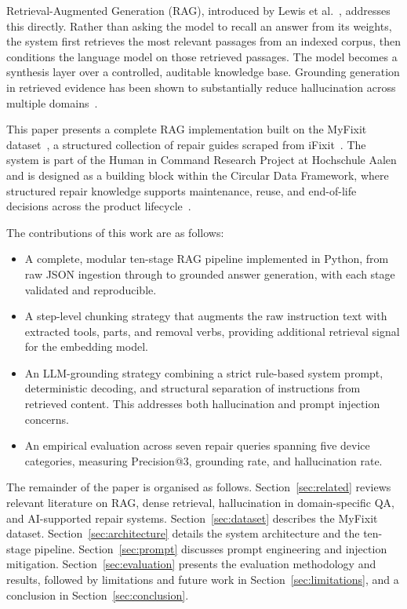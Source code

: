\documentclass[journal,onecolumn]{IEEEtran}
\begin{document}
Retrieval-Augmented Generation (RAG), introduced by Lewis et
al.~\cite{lewis2020rag}, addresses this directly. Rather than asking the model
to recall an answer from its weights, the system first retrieves the most
relevant passages from an indexed corpus, then conditions the language model
on those retrieved passages. The model becomes a synthesis layer over a
controlled, auditable knowledge base. Grounding generation in retrieved
evidence has been shown to substantially reduce hallucination across multiple
domains~\cite{gao2024ragsurvey, domaingroundedretrieval2026}.

This paper presents a complete RAG implementation built on the MyFixit
dataset~\cite{myfixit2021}, a structured collection of repair guides scraped
from iFixit~\cite{ifixit}. The system is part of the Human in Command Research
Project at Hochschule Aalen and is designed as a building block within the
Circular Data Framework, where structured repair knowledge supports
maintenance, reuse, and end-of-life decisions across the product
lifecycle~\cite{aiCircular2022, remanufacturing2025}.

The contributions of this work are as follows:

\begin{itemize}
    \item A complete, modular ten-stage RAG pipeline implemented in Python,
          from raw JSON ingestion through to grounded answer generation, with
          each stage validated and reproducible.
    \item A step-level chunking strategy that augments the raw instruction
          text with extracted tools, parts, and removal verbs, providing
          additional retrieval signal for the embedding model.
    \item An LLM-grounding strategy combining a strict rule-based system
          prompt, deterministic decoding, and structural separation of
          instructions from retrieved content. This addresses both
          hallucination and prompt injection concerns.
    \item An empirical evaluation across seven repair queries spanning five
          device categories, measuring Precision@3, grounding rate, and
          hallucination rate.
\end{itemize}

The remainder of the paper is organised as follows. Section~\ref{sec:related}
reviews relevant literature on RAG, dense retrieval, hallucination in
domain-specific QA, and AI-supported repair systems.
Section~\ref{sec:dataset} describes the MyFixit dataset.
Section~\ref{sec:architecture} details the system architecture and the
ten-stage pipeline. Section~\ref{sec:prompt} discusses prompt engineering and
injection mitigation. Section~\ref{sec:evaluation} presents the evaluation
methodology and results, followed by limitations and future work in
Section~\ref{sec:limitations}, and a conclusion in
Section~\ref{sec:conclusion}.
\end{document}
